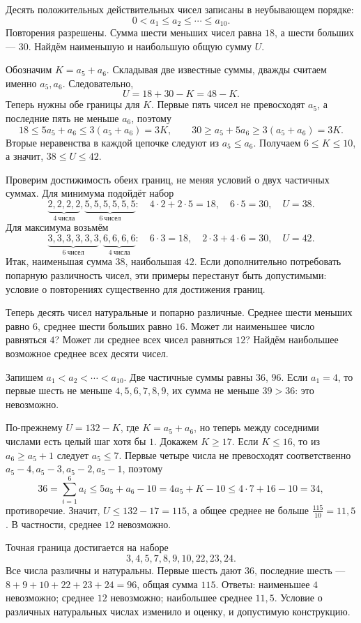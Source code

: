 \begin{example}\label{ex:review-ege-targeted-overlap}
Десять положительных действительных чисел записаны в неубывающем порядке:
\[
0<a_1\le a_2\le\cdots\le a_{10}.
\]
Повторения разрешены. Сумма шести меньших чисел равна \(18\), а шести больших --- \(30\). Найдём наименьшую и наибольшую общую сумму \(U\).

Обозначим \(K=a_5+a_6\). Складывая две известные суммы, дважды считаем именно \(a_5,a_6\). Следовательно,
\[
U=18+30-K=48-K.
\]
Теперь нужны обе границы для \(K\). Первые пять чисел не превосходят \(a_5\), а последние пять не меньше \(a_6\), поэтому
\[
18\le5a_5+a_6\le3(a_5+a_6)=3K,
\qquad
30\ge a_5+5a_6\ge3(a_5+a_6)=3K.
\]
Вторые неравенства в каждой цепочке следуют из \(a_5\le a_6\). Получаем \(6\le K\le10\), а значит, \(38\le U\le42\).

Проверим достижимость обеих границ, не меняя условий о двух частичных суммах. Для минимума подойдёт набор
\[
\underbrace{2,2,2,2}_{4\ \text{числа}},
\underbrace{5,5,5,5,5,5}_{6\ \text{чисел}}:
\quad 4\cdot2+2\cdot5=18,\quad6\cdot5=30,\quad U=38.
\]
Для максимума возьмём
\[
\underbrace{3,3,3,3,3,3}_{6\ \text{чисел}},
\underbrace{6,6,6,6}_{4\ \text{числа}}:
\quad6\cdot3=18,\quad2\cdot3+4\cdot6=30,\quad U=42.
\]
Итак, наименьшая сумма \(38\), наибольшая \(42\). Если дополнительно потребовать попарную различность чисел, эти примеры перестанут быть допустимыми: условие о повторениях существенно для достижения границ.
\end{example}

\begin{example}\label{ex:review-ege-targeted-distinct-overlap}
Теперь десять чисел натуральные и попарно различные. Среднее шести меньших равно \(6\), среднее шести больших равно \(16\). Может ли наименьшее число равняться \(4\)? Может ли среднее всех чисел равняться \(12\)? Найдём наибольшее возможное среднее всех десяти чисел.

Запишем \(a_1<a_2<\cdots<a_{10}\). Две частичные суммы равны \(36\), \(96\). Если \(a_1=4\), то первые шесть не меньше \(4,5,6,7,8,9\), их сумма не меньше \(39>36\): это невозможно.

По-прежнему \(U=132-K\), где \(K=a_5+a_6\), но теперь между соседними числами есть целый шаг хотя бы \(1\). Докажем \(K\ge17\). Если \(K\le16\), то из \(a_6\ge a_5+1\) следует \(a_5\le7\). Первые четыре числа не превосходят соответственно \(a_5-4,a_5-3,a_5-2,a_5-1\), поэтому
\[
36=\sum_{i=1}^6a_i
\le5a_5+a_6-10
=4a_5+K-10
\le4\cdot7+16-10=34,
\]
противоречие. Значит, \(U\le132-17=115\), а общее среднее не больше \(\frac{115}{10}=11{,}5\). В частности, среднее \(12\) невозможно.

Точная граница достигается на наборе
\[
3,4,5,7,8,9,10,22,23,24.
\]
Все числа различны и натуральны. Первые шесть дают \(36\), последние шесть --- \(8+9+10+22+23+24=96\), общая сумма \(115\). Ответы: наименьшее \(4\) невозможно; среднее \(12\) невозможно; наибольшее среднее \(11{,}5\). Условие о различных натуральных числах изменило и оценку, и допустимую конструкцию.
\end{example}

